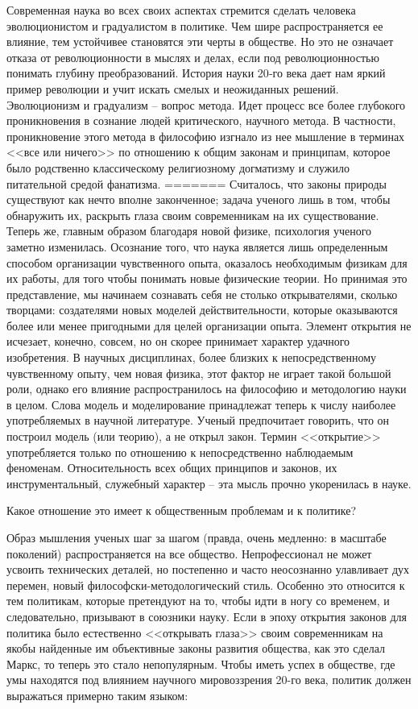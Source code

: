 \documentclass{book}
\begin{document}
Современная наука во всех своих аспектах стремится сделать человека эволюционистом и градуалистом в политике. Чем шире распространяется ее влияние, тем устойчивее становятся эти черты в обществе. Но это не означает отказа от революционности в мыслях и делах, если под революционностью понимать глубину преобразований. История науки 20‑го века дает нам яркий пример революции и учит искать смелых и неожиданных решений. Эволюционизм и градуализм -- вопрос метода. Идет процесс все более глубокого проникновения в сознание людей критического, научного метода. В частности, проникновение этого метода в философию изгнало из нее мышление в терминах <<все или ничего>> по отношению к общим законам и принципам, которое было родственно классическому религиозному догматизму и служило питательной средой фанатизма.
=======
Считалось, что законы природы существуют как нечто вполне законченное; задача ученого лишь в том, чтобы обнаружить их, раскрыть глаза своим современникам на их существование. Теперь же, главным образом благодаря новой физике, психо­логия ученого заметно изменилась. Осознание того, что наука является лишь определенным способом организации чувственного опыта, оказалось необходимым физикам для их работы, для того чтобы понимать новые физические теории. Но прини­мая это представление, мы начинаем сознавать себя не столько открывателями, сколько творцами: создателями новых моде­лей действительности, которые оказываются более или менее пригодными для целей организации опыта. Элемент открытия не исчезает, конечно, совсем, но он скорее принимает характер удачного изобретения.  В научных дисциплинах, более близких к непосредственному чувственному опыту, чем новая физика, этот фактор не играет такой большой роли, однако его влияние распространилось на философию и методологию науки в целом. Слова модель  и 
моделирование  принадлежат теперь к числу наиболее употребляемых в научной литературе. Ученый пред­почитает говорить, что он построил модель (или теорию),  а не открыл закон.  Термин <<открытие>> употребляется только по от­ношению к непосредственно наблюдаемым феноменам. Относи­тельность всех общих принципов и законов, их инструменталь­ный, служебный характер -- эта мысль прочно укоренилась в науке.

Какое отношение это имеет к общественным проблемам и к политике?

Образ мышления ученых шаг за шагом (правда, очень мед­ленно: в масштабе поколений) распространяется на все общест­во. Непрофессионал не может усвоить технических деталей, но постепенно и часто неосознанно улавливает дух перемен, новый философски-методологический стиль. Особенно это относится к тем политикам, которые претендуют на то, чтобы идти в ногу со временем, и следовательно, призывают в союзники науку. Если в эпоху открытия законов для политика было естественно <<открывать глаза>> своим современникам на якобы найден­ные им объективные законы развития общества, как это сделал Маркс, то теперь это стало непопулярным. Чтобы иметь успех в обществе, где умы находятся под влиянием научного мировоззрения 20-го века, политик должен выражаться примерно таким языком:
\end{document}
